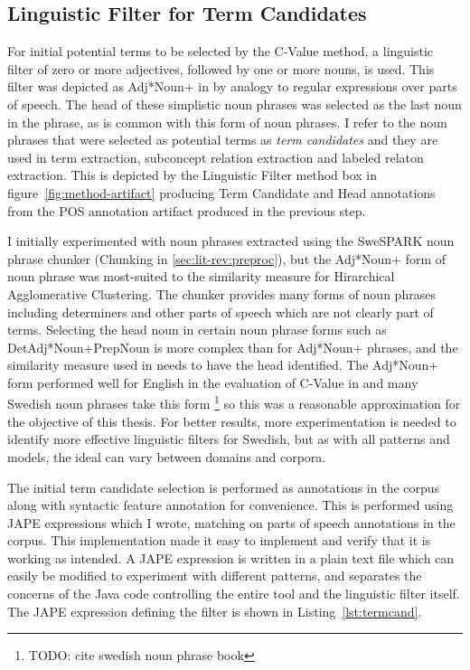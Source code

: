 \documentclass[a4paper]{report}
\newcommand{\todo}[1]{\footnote{{\color{red} TODO: #1}}}
\begin{document}
\subsection{Linguistic Filter for Term Candidates}

For initial potential terms to be selected by the C-Value method, a linguistic filter of zero or more adjectives, followed by one or more nouns, is used.
This filter was depicted as Adj*Noun+ in \cite{Frantzi98CNCValue} by analogy to regular expressions over parts of speech.
The head of these simplistic noun phrases was selected as the last noun in the phrase, as is common with this form of noun phrases.
I refer to the noun phrases that were selected as potential terms as \emph{term candidates} and they are used in term extraction, subconcept relation extraction and labeled relaton extraction.
This is depicted by the Linguistic Filter method box in figure~\ref{fig:method-artifact} producing Term Candidate and Head annotations from the POS annotation artifact produced in the previous step.

I initially experimented with noun phrases extracted using the SweSPARK noun phrase chunker (Chunking in \ref{sec:lit-rev:preproc}), but the Adj*Noun+ form of noun phrase was most-suited to the similarity measure for Hirarchical Agglomerative Clustering.
The chunker provides many forms of noun phrases including determiners and other parts of speech which are not clearly part of terms.
Selecting the head noun in certain noun phrase forms such as DetAdj*Noun+PrepNoun is more complex than for Adj*Noun+ phrases, and the similarity measure used in \cite{Drymonas10OntoGain} needs to have the head identified.
The Adj*Noun+ form performed well for English in the evaluation of C-Value in \cite{Frantzi98CNCValue} and many Swedish noun phrases take this form \todo{cite swedish noun phrase book} so this was a reasonable approximation for the objective of this thesis.
For better results, more experimentation is needed to identify more effective linguistic filters for Swedish, but as with all patterns and models, the ideal can vary between domains and corpora.

The initial term candidate selection is performed as annotations in the corpus along with syntactic feature annotation for convenience.
This is performed using JAPE expressions which I wrote, matching on parts of speech annotations in the corpus.
This implementation made it easy to implement and verify that it is working as intended.
A JAPE expression is written in a plain text file which can easily be modified to experiment with different patterns, and separates the concerns of the Java code controlling the entire tool and the linguistic filter itself.
The JAPE expression defining the filter is shown in Listing~\ref{lst:termcand}.
\end{document}
